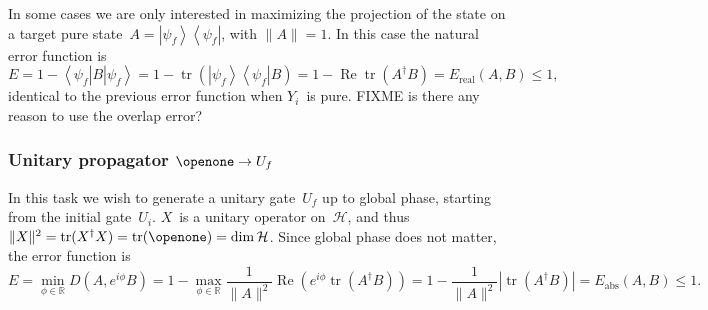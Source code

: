 \documentclass[aps, pra, a4paper, longbibliography, superscriptaddress]{revtex4-1}
\newcommand{\I}{\openone}
\newcommand{\be}{\begin{equation}}
\newcommand{\ee}{\end{equation}}
\newcommand{\R}{{\mathbb R}}  %
\newcommand{\ket}[1]{\left| #1 \right \rangle}
\newcommand{\bra}[1]{\left \langle #1 \right|}
\newcommand{\braket}[2]{\left \langle #1 | #2 \right \rangle}
\newcommand{\ketbra}[2]{\left| #1 \right \rangle \left \langle #2 \right|}
\newcommand{\hilb}[1]{\mathcal{#1}}
\DeclareMathOperator{\tr}{tr}
\DeclareMathOperator{\re}{Re}
\DeclareMathOperator{\cvec}{vec}
\newcommand{\vecop}[1]{\widehat{#1}}
\begin{document}
\begin{comment}
Another option would be to use the $\cvec$-representation $X = \cvec(\rho)$.
$\|X\|^2$~is equivalent to the purity of the state:
\be
\|X\|^2
= \|\cvec(\rho)\|^2
= \|\rho\|^2
= \tr(\rho^2)
= P(\rho).
\ee
Unitary propagation conserves purity, hence $\|B\|$~is constant and we may
simply maximize the fidelity
\be
f(A, B)
= \frac{1}{\|A\|} (\re) \tr(A^\dagger B)
\ee
Furthermore, the fidelity is strictly nonnegative since the
state operators are positive:
\be
0 \le f(A, B) \le \sqrt{\frac{P(\rho_i)}{P(\rho_f)}}.
\ee
If either $\rho_f$ or $\rho_i$ is pure,
$\rho = \ketbra{\psi}{\psi}$,
we have $\|\rho\|^2 = \braket{\psi}{\psi}^2 = 1$, and
the diagram simplifies by splitting up.
\end{comment}

In some cases we are only interested in maximizing the projection of
the state on a target pure state~$A = \ketbra{\psi_f}{\psi_f}$,
with $\|A\| = 1$. In this case the natural error function is
\be
E
= 1 -\bra{\psi_f} B \ket{\psi_f}
= 1 -\tr\left(\ketbra{\psi_f}{\psi_f} B \right)
= 1 -\re \tr\left(A^\dagger B\right)
= E_\text{real}(A, B) \le 1,
\ee
identical to the previous error function when $Y_i$~is pure.
FIXME is there any reason to use the overlap error?


\subsubsection{Unitary propagator $\I \to U_f$}
\label{sec:closed-u}
In this task we wish to generate a unitary gate~$U_f$ up to global
phase, starting from the initial gate~$U_i$.
$X$~is a unitary operator on~$\hilb{H}$, and
thus $\|X\|^2 = \tr(X^\dagger X) = \tr(\I) = \dim \hilb{H}$.
Since global phase does not matter, the error function is
\be
E
= \min_{\phi \in \R} D(A, e^{i \phi} B)
= 1 -\max_{\phi \in \R} \frac{1}{\|A\|^2} \re \left( e^{i \phi} \tr(A^\dagger B)\right)
= 1 -\frac{1}{\|A\|^2}|\tr(A^\dagger B)|
= E_\text{abs}(A, B) \le 1.
\ee
\begin{comment}
We can also get rid of phase by explicitly lifting the problem into
Liouville space (see Eq.~\eqref{eq:L-unitary}),
$X = \vecop{V} = V^* \otimes V$,
and then minimize the operator distance~$D(A, B)$.
Using Eq.~\eqref{eq:hat-product}, the norm squared is 
\be
\|X\|^2 = \|\vecop{V}\|^2
= \tr(\vecop{V}^\dagger \vecop{V})
= |\tr(V^\dagger V)|^2
= |\tr(\I)|^2
= (\dim \hilb{H})^2
= \|V\|^4.
\ee
This is constant, so we may maximize the fidelity instead:
\be
f(A, B)
= \frac{1}{\|A\|^2} \re \tr \left(A^\dagger B \right)
= \frac{1}{\|V_f\|^4} \left| \tr \left(V_f^\dagger V_n \right) \right|^2.
\ee
It clearly obeys $0 \le f(A, B) \le 1$.
Much like in
Sec.~\ref{sec:closed-pure},
the problem simplifies back into Hilbert space, and we may equivalently
choose~$X = V$.
\end{comment}
\end{document}
